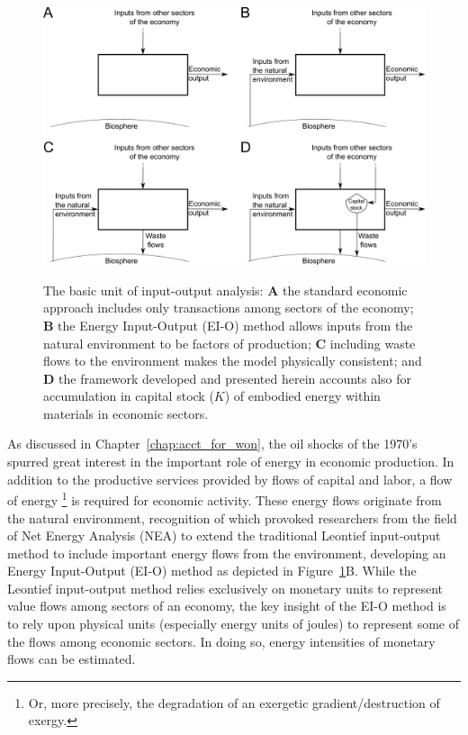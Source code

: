 \begin{figure}[!ht]
\centering\
\includegraphics[width=\linewidth]{Part_2/Chapter_Intensity/images/Basic_unit_square.pdf}
\caption[The basic unit of input-output analysis]{The basic unit 
of input-output analysis: 
\textbf{A} the standard economic approach includes only transactions 
among sectors of the economy; 
\textbf{B} the Energy Input-Output (EI-O) method allows inputs 
from the natural environment to be factors of production; 
\textbf{C} including waste flows to the environment makes the model physically consistent; and
\textbf{D} the framework developed and presented herein accounts also for accumulation
in capital stock ($K$) of embodied energy within materials in economic sectors.}
\label{fig:basic_unit}
\end{figure}

As discussed in Chapter~\ref{chap:acct_for_won}, 
the oil shocks of the 1970's spurred great interest in
the important role of energy in economic production.
In addition to the productive services 
provided by flows of capital and labor,
a flow of energy%
	\footnote{
	Or, more precisely, 
	the degradation of an exergetic gradient/destruction of exergy.
	} 
is required for economic activity. 
These energy flows originate from the natural environment, 
recognition of which provoked researchers from the field of 
Net Energy Analysis (NEA) to extend 
the traditional Leontief
input-output method to include important 
energy flows from the environment, 
developing an Energy Input-Output (EI-O)
method as depicted in Figure~\ref{fig:basic_unit}B.\cite{Carter1974,
Bullard1975,Bullard1976a,Herendeen1978,Costanza:1980ww,
Casler1984,Joshi:1999uw,Suh2009}
While the Leontief input-output method
relies exclusively 
on monetary units to represent value flows 
among sectors of an economy, 
the key insight of the EI-O method 
is to rely upon physical units 
(especially energy units of joules) 
to represent some of the flows among economic sectors. 
In doing so, 
energy intensities of monetary flows can be estimated. 


